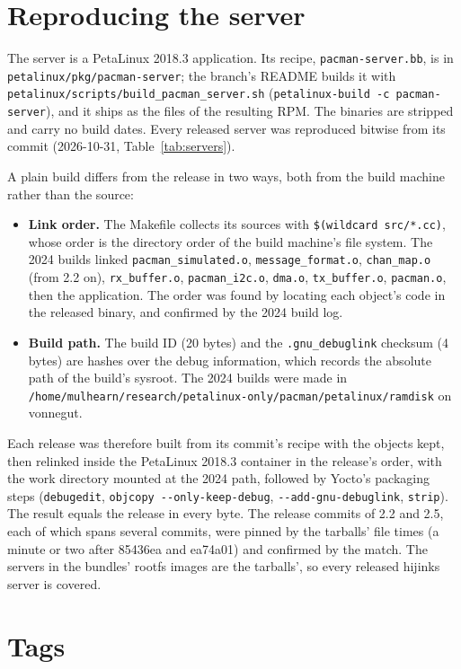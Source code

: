\documentclass[11pt]{article}
\newcommand{\h}[1]{\texttt{#1}}
\begin{document}
\section{Reproducing the server}

{\raggedright The server is a PetaLinux 2018.3 application.  Its recipe, \h{pacman-server.bb}, is in
\h{petalinux/pkg/pacman-server}; the branch's README builds it with
\h{petalinux/scripts/build\_pacman\_server.sh} (\h{petalinux-build -c pacman-server}), and it ships as the files of
the resulting RPM.  The binaries are stripped and carry no build
dates.  Every released server was reproduced bitwise from its commit (2026-10-31, Table~\ref{tab:servers}).\par}

A plain build differs from the release in two ways, both from the build machine rather than the source:
\begin{itemize}
\item \textbf{Link order.}  The Makefile collects its sources with \h{\$(wildcard src/*.cc)}, whose order is the
  directory order of the build machine's file system.  The 2024 builds linked \h{pacman\_simulated.o},
  \h{message\_format.o}, \h{chan\_map.o} (from 2.2 on), \h{rx\_buffer.o}, \h{pacman\_i2c.o}, \h{dma.o},
  \h{tx\_buffer.o}, \h{pacman.o}, then the application.  The order was found by locating each object's code in the
  released binary, and confirmed by the 2024 build log.
\item \textbf{Build path.}  The build ID (20 bytes) and the \h{.gnu\_debuglink} checksum (4 bytes) are hashes over
  the debug information, which records the absolute path of the build's sysroot.  The 2024 builds were made in
  \h{/home/mulhearn/research/petalinux-only/pacman/petalinux/ramdisk} on vonnegut.
\end{itemize}
Each release was therefore built from its commit's recipe with the objects kept, then relinked inside the
PetaLinux 2018.3 container in the release's order, with the work directory mounted at the 2024 path, followed by
Yocto's packaging steps (\h{debugedit}, \h{objcopy -{}-only-keep-debug}, \h{-{}-add-gnu-debuglink}, \h{strip}).  The
result equals the release in every byte.  The release commits of 2.2 and 2.5, each of which spans several commits,
were pinned by the tarballs' file times (a minute or two after 85436ea and ea74a01) and confirmed by the match.
The servers in the bundles' rootfs images are the tarballs', so every released hijinks server is covered.

\section{Tags}\label{sec:tags}
\end{document}
